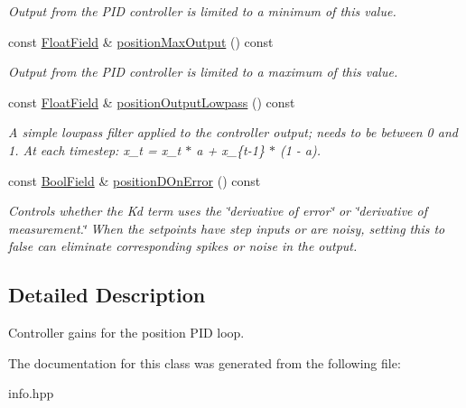 \begin{DoxyCompactItemize}
\begin{DoxyCompactList}\small\item\em Output from the P\+ID controller is limited to a minimum of this value. \end{DoxyCompactList}\item 
\mbox{\label{classhebi_1_1Info_1_1Settings_1_1Actuator_1_1PositionGains_aaea3887c73d4aac676724a16c2709e96}} 
const \hyperlink{classhebi_1_1Info_1_1FloatField}{Float\+Field} \& \hyperlink{classhebi_1_1Info_1_1Settings_1_1Actuator_1_1PositionGains_aaea3887c73d4aac676724a16c2709e96}{position\+Max\+Output} () const
\begin{DoxyCompactList}\small\item\em Output from the P\+ID controller is limited to a maximum of this value. \end{DoxyCompactList}\item 
\mbox{\label{classhebi_1_1Info_1_1Settings_1_1Actuator_1_1PositionGains_a3ac86279e498baa3f4fdceda696e83b6}} 
const \hyperlink{classhebi_1_1Info_1_1FloatField}{Float\+Field} \& \hyperlink{classhebi_1_1Info_1_1Settings_1_1Actuator_1_1PositionGains_a3ac86279e498baa3f4fdceda696e83b6}{position\+Output\+Lowpass} () const
\begin{DoxyCompactList}\small\item\em A simple lowpass filter applied to the controller output; needs to be between 0 and 1. At each timestep\+: x\+\_\+t = x\+\_\+t $\ast$ a + x\+\_\+\{t-\/1\} $\ast$ (1 -\/ a). \end{DoxyCompactList}\item 
\mbox{\label{classhebi_1_1Info_1_1Settings_1_1Actuator_1_1PositionGains_a293b8beb9ca4bf91705b59ab0b8434eb}} 
const \hyperlink{classhebi_1_1Info_1_1BoolField}{Bool\+Field} \& \hyperlink{classhebi_1_1Info_1_1Settings_1_1Actuator_1_1PositionGains_a293b8beb9ca4bf91705b59ab0b8434eb}{position\+D\+On\+Error} () const
\begin{DoxyCompactList}\small\item\em Controls whether the Kd term uses the \char`\"{}derivative of error\char`\"{} or \char`\"{}derivative of measurement.\char`\"{} When the setpoints have step inputs or are noisy, setting this to {\ttfamily false} can eliminate corresponding spikes or noise in the output. \end{DoxyCompactList}\end{DoxyCompactItemize}


\subsection{Detailed Description}
Controller gains for the position P\+ID loop. 

The documentation for this class was generated from the following file\+:\begin{DoxyCompactItemize}
\item 
info.\+hpp\end{DoxyCompactItemize}
